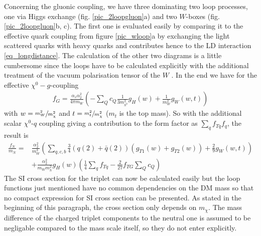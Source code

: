 \noindent Concerning the gluonic coupling, we have three dominating two loop processes, one via Higgs exchange (fig. \ref{pic_2loopgluon}a) and two
$W$-boxes (fig. \ref{pic_2loopgluon}b, c). The first one is evaluated easily by comparing it to the effective quark coupling from figure \ref{pic_wloop}a
by exchanging the light scattered quarks with heavy quarks and contributes hence to the LD interaction \eqref{eq_longdistance}. The calculation of 
the other two diagrams is a little cumbersome since the loops have to be calculated explicitly with the additional treatment of the vacuum polarisation
tensor of the $W$ \cite{1007.2601}. In the end we have for the effective $\chi^0-g$-coupling
\begin{align}
 f_G = \frac{\alpha_s\alpha_2^2}{4\pi m_W}\left(-\sum\limits_Q c_Q \frac{1}{3m_{h^0}^2} g_H(w) + \frac{1}{m_W^2} g_{W}(w,t) \right)
\end{align}
with $w=\sfrac{m_W^2}{m_\chi^2}$ and $t=\sfrac{m_t^2}{m_\chi^2}$ ($m_t$ is the top mass).
So with the additional scalar $\chi^0$-$q$ coupling giving a contribution to the form factor as $\sum_qf_{Tq}f_q$, the result is
\begin{align}
 \frac{f_N}{m_N} =& \frac{\alpha_2^2}{m_W^3}\left(\sum\limits_{q,c,b} \frac34 \left(q(2)+\bar q(2)\right) \left(g_{T1}(w) + g_{T2}(w)\right) + \frac29g_W(w,t)\right) \\
 \nonumber
 &+ \frac{\alpha_2^2}{m_W m_h^2}g_H(w) \left(\frac14 \sum\limits_q f_{Tq} - \frac{2}{27}f_{TG}\sum\limits_Q c_Q \right)
\end{align}
The SI cross section for the triplet can now be calculated easily but the loop functions just mentioned have no common dependencies on the DM mass
so that no compact expression for SI cross section can be presented. As stated in the beginning of this paragraph, the cross section only depends
on $m_\chi$. The mass difference of the charged triplet components to the neutral one is assumed to be negligable compared to the mass scale itself,
so they do not enter explicitly. 












